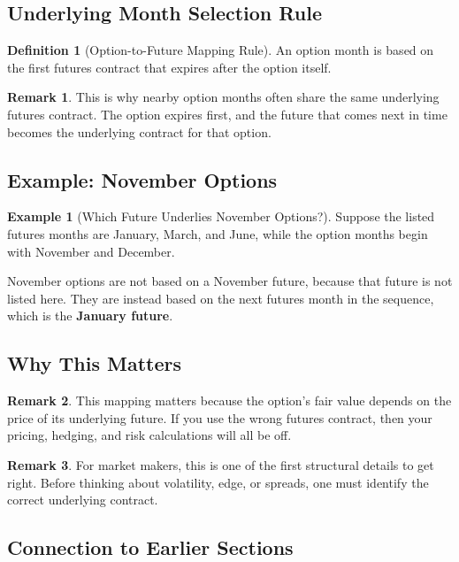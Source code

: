 \documentclass[11pt]{article}
\theoremstyle{definition}
\newtheorem{definition}{Definition}[section]
\newtheorem{example}{Example}[section]
\newtheorem{remark}{Remark}[section]
\begin{document}
\subsection{Underlying Month Selection Rule}

\begin{definition}[Option-to-Future Mapping Rule]
An option month is based on the first futures contract that expires after the option itself.
\end{definition}

\begin{remark}
This is why nearby option months often share the same underlying futures contract. The option expires first, and the future that comes next in time becomes the underlying contract for that option.
\end{remark}

\subsection{Example: November Options}

\begin{example}[Which Future Underlies November Options?]
Suppose the listed futures months are January, March, and June, while the option months begin with November and December.

November options are not based on a November future, because that future is not listed here. They are instead based on the next futures month in the sequence, which is the \textbf{January future}.
\end{example}

\subsection{Why This Matters}

\begin{remark}
This mapping matters because the option's fair value depends on the price of its underlying future. If you use the wrong futures contract, then your pricing, hedging, and risk calculations will all be off.
\end{remark}

\begin{remark}
For market makers, this is one of the first structural details to get right. Before thinking about volatility, edge, or spreads, one must identify the correct underlying contract.
\end{remark}

\subsection{Connection to Earlier Sections}
\end{document}
